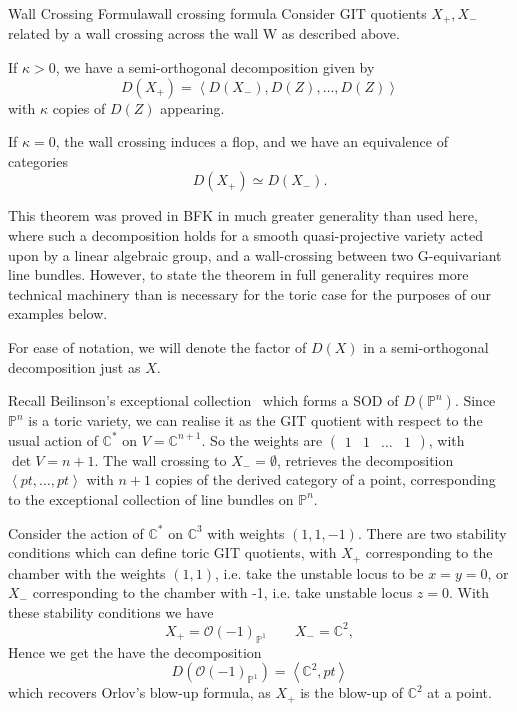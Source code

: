 \begin{theorem}{Wall Crossing Formula}{wall crossing formula}
Consider GIT quotients $X_{+},X_{-}$  related by a wall crossing across the wall W as described above. 

If $\kappa > 0$, we have a semi-orthogonal decomposition given by $$D(X_{+}) = \left< D(X_{-}),D(Z) , \dots, D(Z)  \right>$$with $\kappa$ copies of $D(Z)$ appearing.

If $\kappa = 0$, the wall crossing induces a flop, and we have an equivalence of categories $$D(X_{+})\simeq D(X_-).$$
\end{theorem}

This theorem was proved in BFK in much greater generality than used here, where such a decomposition holds for a smooth quasi-projective variety acted upon by a linear algebraic group, and a wall-crossing between two G-equivariant line bundles. However, to state the theorem in full generality requires more technical machinery than is necessary for the toric case for the purposes of our examples below. 

For ease of notation, we will denote the factor of $D(X)$ in a semi-orthogonal decomposition just as $X$. 

\begin{example}{}{}
    Recall Beilinson's exceptional collection~\cite*{Beilinson1978} which forms a SOD of $D(\mathbb{P}^n)$. Since $\mathbb{P}^n$ is a toric variety, we can realise it as the GIT quotient with respect to the usual action of $\mathbb{C}^*$ on $V = \mathbb{C}^{n+1}$. So the weights are $\begin{pmatrix}1 & 1 &\dots &1\end{pmatrix}$, with $\det V = n+1$. The wall crossing to $X_{-}=\emptyset$, retrieves the decomposition $\left< pt, \dots,pt \right>$ with $n+1$ copies of the derived category of a point, corresponding to the exceptional collection of line bundles on $\mathbb{P}^n$. 
\end{example}

\begin{example}{}{}
    Consider the action of $\mathbb{C}^{*}$ on $\mathbb{C}^3$ with weights $(1,1,-1)$. There are two stability conditions which can define toric GIT quotients, with $X_+$ corresponding to the chamber with the weights $(1,1)$, i.e. take the unstable locus to be $x=y= 0$, or $X_-$ corresponding to the chamber with -1, i.e. take unstable locus $z = 0$. With these stability conditions we have $$X_{+}= \mathcal{O}(-1)_{\mathbb{P}^{1}} \qquad X_{-}= \mathbb{C}^2, $$ Hence we get the have the decomposition $$D(\mathcal{O}(-1)_{\mathbb{P}^{1}})= \left< \mathbb{C}^{2}, pt \right> $$ which recovers Orlov's blow-up formula, as $X_+$ is the blow-up of $\mathbb{C}^2$ at a point.
\end{example}

